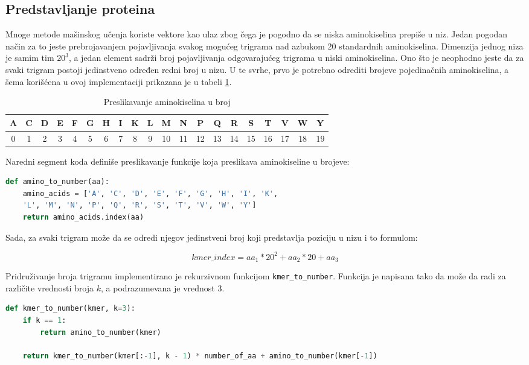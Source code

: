 \subsection{Predstavljanje proteina}
\label{subsec:proteins}

Mnoge metode mašinskog učenja koriste vektore kao ulaz zbog čega je pogodno da se niska aminokiselina prepiše u niz. Jedan pogodan način za to jeste prebrojavanjem pojavljivanja svakog mogućeg trigrama nad azbukom 20 standardnih aminokiselina. Dimenzija jednog niza je samim tim $20^3$, a jedan element sadrži broj pojavljivanja odgovarajućeg trigrama u niski aminokiselina. Ono što je neophodno jeste da za svaki trigram postoji jedinstveno određen redni broj u nizu. U te svrhe, prvo je potrebno odrediti brojeve pojedinačnih aminokiselina, a šema korišćena u ovoj implementaciji prikazana je u tabeli \ref{tab: aminosNumbers}.


\begin{table}[H]
	\centering
	\begin{tabular}{|c|c|c|c|c|c|c|c|c|c|c|c|c|c|c|c|c|c|c|c|}
		\hline
		A & C & D & E & F & G & H & I & K & L & M & N & P & Q & R & S & T & V & W & Y \\
		\hline
		0 & 1 & 2 & 3 & 4 & 5 & 6 & 7 & 8 & 9 & 10 & 11 & 12 & 13 & 14 & 15 & 16 & 17 & 18 & 19 \\
		\hline             
	\end{tabular}
	\caption{Preslikavanje aminokiselina u broj}
	\label{tab: aminosNumbers}
\end{table}


Naredni segment koda definiše preslikavanje funkcije koja preslikava aminokiseline u brojeve:

\begin{lstlisting}[language=Python]
def amino_to_number(aa):
	amino_acids = ['A', 'C', 'D', 'E', 'F', 'G', 'H', 'I', 'K', 
	'L', 'M', 'N', 'P', 'Q', 'R', 'S', 'T', 'V', 'W', 'Y']
	return amino_acids.index(aa)
\end{lstlisting}


Sada, za svaki trigram može da se odredi njegov jedinstveni broj koji predstavlja poziciju u nizu i to formulom:

$$kmer\_index = aa_1*20^2 + aa_2 * 20 + aa_3$$

\noindent Pridruživanje broja trigramu implementirano je rekurzivnom funkcijom \verb|kmer_to_number|. Funkcija je napisana tako da može da radi za različite vrednosti broja $k$, a podrazumevana je vrednost 3.
\begin{lstlisting}[language=Python]
def kmer_to_number(kmer, k=3):
	if k == 1:
		return amino_to_number(kmer)
	
	return kmer_to_number(kmer[:-1], k - 1) * number_of_aa + amino_to_number(kmer[-1])
\end{lstlisting}


